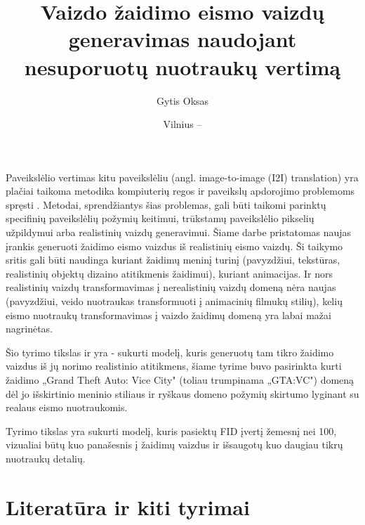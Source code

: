 \documentclass{VUMIFPSkursinis}
\institute{Informatikos institutas}  %
\title{Vaizdo žaidimo eismo vaizdų generavimas naudojant nesuporuotų nuotraukų vertimą}
\author{Gytis Oksas}
\date{Vilnius – \the\year}
\begin{document}
\maketitle

\tableofcontents

    Paveikslėlio vertimas kitu paveikslėliu (angl. image-to-image (I2I) translation) yra plačiai taikoma metodika kompiuterių regos ir paveikslų apdorojimo problemoms spręsti \cite{ImTImTr}. Metodai, sprendžiantys šias problemas, gali būti taikomi parinktų specifinių paveikslėlių požymių keitimui, trūkstamų paveikslėlio pikselių užpildymui arba realistinių vaizdų generavimui. Šiame darbe pristatomas naujas įrankis generuoti žaidimo eismo vaizdus iš realistinių eismo vaizdų. Ši taikymo sritis gali būti naudinga kuriant žaidimų meninį turinį (pavyzdžiui, tekstūras, realistinių objektų dizaino atitikmenis žaidimui), kuriant animacijas. Ir nors realistinių vaizdų transformavimas į nerealistinių vaizdų domeną nėra naujas (pavyzdžiui, veido nuotraukas transformuoti į animacinių filmukų stilių), kelių eismo nuotraukų transformavimas į vaizdo žaidimų domeną yra labai mažai nagrinėtas.
    
    Šio tyrimo tikslas ir yra - sukurti modelį, kuris generuotų tam tikro žaidimo vaizdus iš jų norimo realistinio atitikmens, šiame tyrime buvo pasirinkta kurti žaidimo „Grand Theft Auto: Vice City" (toliau trumpinama „GTA:VC") domeną dėl jo išskirtinio meninio stiliaus ir ryškaus domeno požymių skirtumo lyginant su realaus eismo nuotraukomis.
    
    Tyrimo tikslas yra sukurti modelį, kuris pasiektų FID įvertį žemesnį nei 100, vizualiai būtų kuo panašesnis į žaidimų vaizdus ir išsaugotų kuo daugiau tikrų nuotraukų detalių.
\section{Literatūra ir kiti tyrimai}
\end{document}
